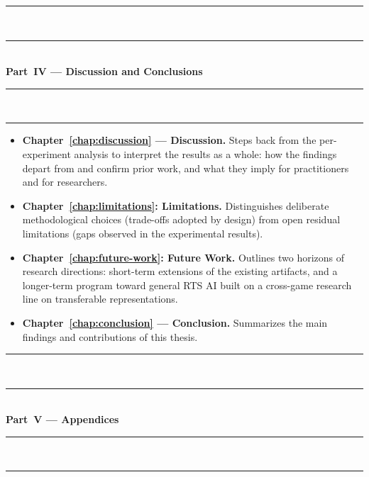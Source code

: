 \rule{\linewidth}{0.4pt}\\[-1.0em]
        \rule{\linewidth}{0.4pt}\\[+0.0em]
        \textbf{Part~IV --- Discussion and Conclusions}\\[-0.5em]
        \rule{\linewidth}{0.4pt}\\[-1.0em]
        \rule{\linewidth}{0.4pt}

\begin{itemize}

      \item \textbf{Chapter~\ref{chap:discussion} --- Discussion.} Steps back from the per-experiment analysis to interpret the results as a whole: how the findings depart from and confirm prior work, and what they imply for practitioners and for researchers.

      \item \textbf{Chapter~\ref{chap:limitations}: Limitations.} Distinguishes deliberate methodological choices (trade-offs adopted by design) from open residual limitations (gaps observed in the experimental results).

      \item \textbf{Chapter~\ref{chap:future-work}: Future Work.} Outlines two horizons of research directions: short-term extensions of the existing artifacts, and a longer-term program toward general RTS AI built on a cross-game research line on transferable representations.

      \item \textbf{Chapter~\ref{chap:conclusion} --- Conclusion.} Summarizes the main findings and contributions of this thesis.

\end{itemize}

\rule{\linewidth}{0.4pt}\\[-1.0em]
        \rule{\linewidth}{0.4pt}\\[+0.0em]
        \textbf{Part~V --- Appendices}\\[-0.5em]
        \rule{\linewidth}{0.4pt}\\[-1.0em]
        \rule{\linewidth}{0.4pt}
        
